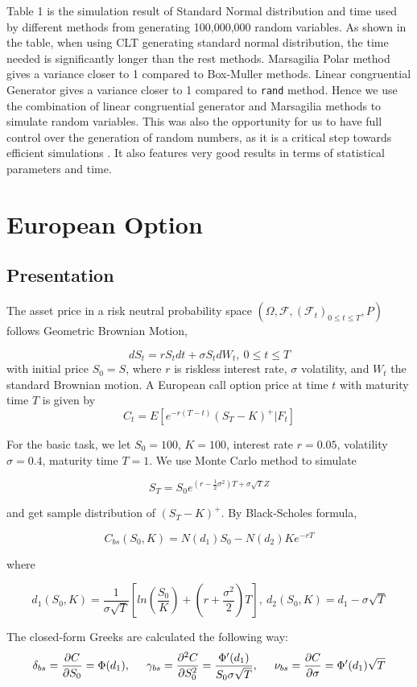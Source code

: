 \documentclass[11pt,a4paper,fleqn,draft]{article}
\begin{document}
Table 1  is the simulation result of Standard Normal distribution and time used by different methods from generating 100,000,000 random variables. As shown in the table, when using CLT generating standard normal distribution, the time needed is significantly longer than the rest methods. Marsagilia Polar method gives a variance closer to 1 compared to Box-Muller methods. Linear congruential Generator gives a variance closer to 1 compared to \texttt{rand} method. Hence we use the combination of linear congruential generator and Marsagilia methods to simulate random variables. This was also the opportunity for us to have full control over the generation of random numbers, as it is a critical step towards efficient simulations \cite{lectures}. It also features very good results in terms of statistical parameters and time.


\FloatBarrier

\section{European Option}

\subsection{Presentation}
The asset price in a risk neutral probability space $(\Omega, \mathcal{F}, (\mathcal{F}_t)_{0\leq t\leq T}, P)$ follows Geometric Brownian Motion,

$$dS_t=rS_tdt+\sigma S_tdW_t, \ 0\leq t \leq T$$
with initial price $S_0 = S$, where $r$ is riskless interest rate, $\sigma$ volatility, and $W_t$ the standard Brownian motion. A European call option price at time $t$ with maturity time $T$ is given by
$$C_t = E[e^{-r(T-t)}(S_T-K)^+|\textit{F}_t]$$

For the basic task, we let $S_0 = 100$, $K=100$, interest rate $r = 0.05$, volatility $\sigma = 0.4$, maturity time $T =1$. We use Monte Carlo method to simulate 

$$S_T=S_0e^{(r-\frac{1}{2}\sigma ^2)T+\sigma \sqrt{T}Z} $$

and get sample distribution of $(S_T-K)^+$. By Black-Scholes formula,


$$C_{bs}(S_0, K) = N(d_1)S_0 - N(d_2)Ke^{-rT}$$

where

$$d_1(S_0,K)=\frac{1}{\sigma \sqrt{T}}[ln(\frac{S_0}{K})+(r+\frac{\sigma^2}{2})T],\ d_2(S_0,K) = d_1-\sigma \sqrt{T}$$

The closed-form Greeks are calculated the following way:
$$\delta_{bs} = \frac{\partial C}{\partial S_0}=\Phi(d_1),\hspace*{.5cm} \gamma_{bs} = \frac{\partial^2 C}{\partial S_0^2}=\frac{\Phi'(d_1)}{S_0\sigma \sqrt{T}},\hspace*{.5cm} \nu_{bs} =  \frac{\partial C}{\partial \sigma}=\Phi'(d_1)\sqrt{T}$$
\end{document}
